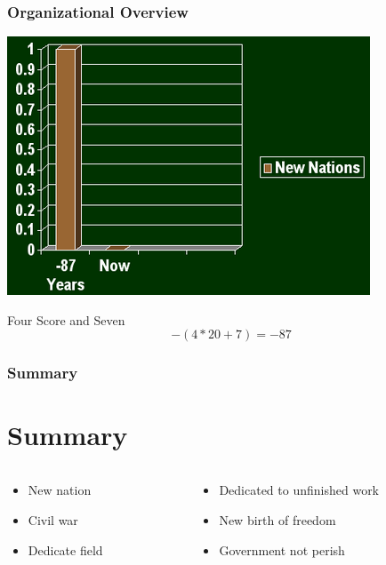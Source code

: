 \documentclass{beamer}
\begin{document}
\begin{frame}
\frametitle{Organizational Overview}

\begin{center}
\includegraphics[scale=0.4]{gettysburg_graph}
\end{center}

\begin{block}{Four Score and Seven}
\begin{equation}
-(4 * 20 + 7) = -87
\end{equation}
\end{block}
\end{frame}


\begin{frame}
\frametitle{Summary}
\section{Summary}
\begin{columns}
\begin{column}{0.4\textwidth}
\begin{itemize}
\item New nation
\item Civil war
\item Dedicate field
\end{itemize}
\end{column}
\begin{column}{0.6\textwidth}
\begin{itemize}
\item Dedicated to unfinished work
\item New birth of freedom
\item Government not perish
\end{itemize}
\end{column}
\end{columns}
\end{frame}
\end{document}
